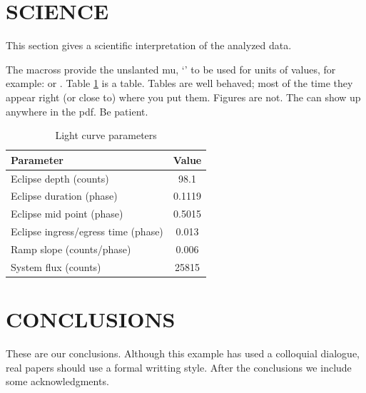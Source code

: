 \section{SCIENCE}
\label{sec:science}

This section gives a scientific interpretation of the analyzed data.

The macross provide the unslanted mu, `{\micro}' to be used for units of
values, for example: {\micron} or {\microbar}.
Table \ref{table:parameters} is a table.  Tables are well behaved;
most of the time they appear right (or close to) where you put them.
Figures are not.  The can show up anywhere in the pdf.   Be patient.

\begin{table}[ht]
\centering
\caption{\label{table:parameters} Light curve parameters}
\begin{tabular}{lc}
\hline
\hline
Parameter                           & Value           \\
\hline
Eclipse depth (counts)              & 98.1            \\
Eclipse duration (phase)            & 0.1119          \\
Eclipse mid point (phase)           & 0.5015          \\
Eclipse ingress/egress time (phase) & 0.013           \\
Ramp slope (counts/phase)           & 0.006           \\
System flux (counts)                & 25815           \\
\hline
\end{tabular}
\end{table}


\section{CONCLUSIONS}
\label{sec:conclusions}

These are our conclusions.  Although this example has used a colloquial
dialogue, real papers should use a formal writting style.  After the
conclusions we include some acknowledgments.


